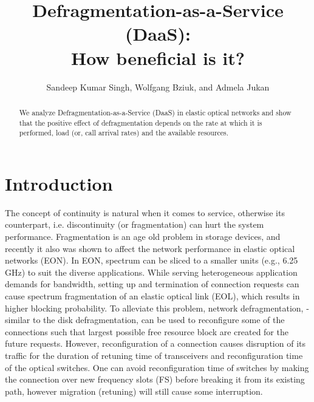 \documentclass[letterpaper,10pt]{article}
\begin{document}
\title{Defragmentation-as-a-Service (DaaS): \\How beneficial is it?}

\author{Sandeep Kumar Singh, Wolfgang Bziuk, and Admela Jukan}
\address{Technische Universit\"at Carolo-Wilhelmina zu Braunschweig, Germany}

\begin{abstract}
We analyze Defragmentation-as-a-Service (DaaS) in elastic optical networks and show that the positive effect of defragmentation depends on the rate at which it is performed, load (or, call arrival rates) and the available resources. \end{abstract}



\section{Introduction}
\par The concept of continuity is natural when it comes to service, otherwise its counterpart, i.e. discontinuity (or fragmentation)  can hurt the system performance. Fragmentation is an age old problem in storage devices, and recently it also was shown to affect the network performance in elastic optical networks (EON). In EON, spectrum can be sliced to a smaller units (e.g., 6.25 GHz) to suit the diverse applications. While serving heterogeneous application demands for bandwidth, setting up and termination of connection requests can cause spectrum fragmentation of an elastic optical link (EOL), which results in higher blocking probability. To alleviate this problem, network defragmentation, - similar to the disk defragmentation, can be used to reconfigure some of the connections such that largest possible free resource block are created for the future requests. However, reconfiguration of a connection causes  disruption of its traffic for the duration of retuning time of transceivers   and  reconfiguration time of the optical switches. One can avoid reconfiguration time of switches  by making the connection over new frequency slots (FS) before breaking it from its existing path, however migration (retuning) will still cause some interruption.
\end{document}
